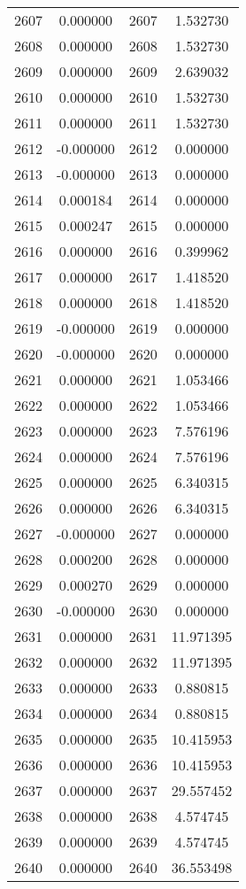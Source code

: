 \documentclass[12pt]{article}
\begin{document}
\begin{longtable}{@{}cccc@{}}
2607 & 0.000000 & 2607 & 1.532730 \\
2608 & 0.000000 & 2608 & 1.532730 \\
2609 & 0.000000 & 2609 & 2.639032 \\
2610 & 0.000000 & 2610 & 1.532730 \\
2611 & 0.000000 & 2611 & 1.532730 \\
2612 & -0.000000 & 2612 & 0.000000 \\
2613 & -0.000000 & 2613 & 0.000000 \\
2614 & 0.000184 & 2614 & 0.000000 \\
2615 & 0.000247 & 2615 & 0.000000 \\
2616 & 0.000000 & 2616 & 0.399962 \\
2617 & 0.000000 & 2617 & 1.418520 \\
2618 & 0.000000 & 2618 & 1.418520 \\
2619 & -0.000000 & 2619 & 0.000000 \\
2620 & -0.000000 & 2620 & 0.000000 \\
2621 & 0.000000 & 2621 & 1.053466 \\
2622 & 0.000000 & 2622 & 1.053466 \\
2623 & 0.000000 & 2623 & 7.576196 \\
2624 & 0.000000 & 2624 & 7.576196 \\
2625 & 0.000000 & 2625 & 6.340315 \\
2626 & 0.000000 & 2626 & 6.340315 \\
2627 & -0.000000 & 2627 & 0.000000 \\
2628 & 0.000200 & 2628 & 0.000000 \\
2629 & 0.000270 & 2629 & 0.000000 \\
2630 & -0.000000 & 2630 & 0.000000 \\
2631 & 0.000000 & 2631 & 11.971395 \\
2632 & 0.000000 & 2632 & 11.971395 \\
2633 & 0.000000 & 2633 & 0.880815 \\
2634 & 0.000000 & 2634 & 0.880815 \\
2635 & 0.000000 & 2635 & 10.415953 \\
2636 & 0.000000 & 2636 & 10.415953 \\
2637 & 0.000000 & 2637 & 29.557452 \\
2638 & 0.000000 & 2638 & 4.574745 \\
2639 & 0.000000 & 2639 & 4.574745 \\
2640 & 0.000000 & 2640 & 36.553498 \\

\end{longtable}
\end{document}
